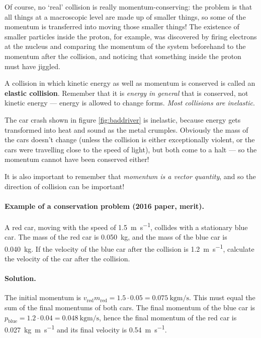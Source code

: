 \documentclass[a4paper]{amsbook}
\begin{document}
Of course, no `real' collision is really momentum-conserving: the problem is that all things at a macroscopic level are made up of smaller things,
so some of the momentum is transferred into moving those smaller things! The existence of smaller particles inside the proton, for example, was
discovered by firing electrons at the nucleus and comparing the momentum of the system beforehand to the momentum after the collision, and noticing
that something inside the proton must have jiggled.

A collision in which kinetic energy as well as momentum is conserved is called an \textbf{elastic collision}. Remember that it is \emph{energy in general} that
is conserved, not kinetic energy --- energy is allowed to change forms. \emph{Most collisions are inelastic}.

The car crash shown in figure \ref{fig:baddriver} is inelastic, because energy gets transformed into heat and sound as the metal
crumples. Obviously the mass of the cars doesn't change (unless the collision is either exceptionally violent, or the cars were
travelling close to the speed of light), but both come to a halt --- so the momentum cannot have been conserved either!

It is also important to remember that \emph{momentum is a vector quantity}, and so the direction of collision can be important!

\paragraph{Example of a conservation problem (2016 paper, merit).} A red car, moving with the speed of \SI{1.5}{\metre\per\second},
collides with a stationary blue car. The mass of the red car is \SI{0.050}{\kilo\gram}, and the mass of the blue car is
\SI{0.040}{\kilo\gram}. If the velocity of the blue car after the collision is \SI{1.2}{\metre\per\second}, calculate the
velocity of the car after the collision.

\paragraph{Solution.} The initial momentum is $ v_{\text{red}} m_{\text{red}} = 1.5 \cdot 0.05 = \SI{0.075}{\kilo\gram\metre\per\second} $.
This must equal the sum of the final momentums of both cars. The final momentum of the blue car is $ p_{\text{blue}} = 1.2 \cdot 0.04 =
\SI{0.048}{\kilo\gram\metre\per\second} $, hence the final momentum of the red car is \SI{0.027}{\kilo\gram\metre\per\second} and its
final velocity is \SI{0.54}{\metre\per\second}.
\end{document}
